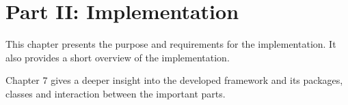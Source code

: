 \section*{Part II: Implementation}

  \vspace{1mm}

\noindent  This chapter presents the purpose and requirements for the implementation. It also provides a short overview of the implementation. \\

  \vspace{1mm}

\noindent  Chapter 7 gives a deeper insight into the developed framework and its packages, classes and interaction between the important parts. \\